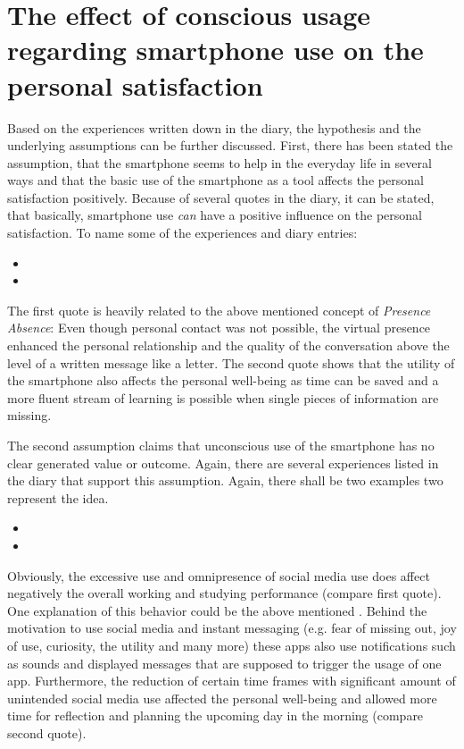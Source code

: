 \section*{The effect of conscious usage regarding smartphone use on the personal satisfaction}
Based on the experiences written down in the diary, the hypothesis and the underlying assumptions can be further discussed. First, there has been stated the assumption, that the smartphone seems to help in the everyday life in several ways and that the basic use of the smartphone as a tool affects the personal satisfaction positively. Because of several quotes in the diary, it can be stated, that basically, smartphone use \textit{can} have a positive influence on the personal satisfaction. To name some of the experiences and diary entries:
\begin{itemize}
\item {}
\item {}
\end{itemize}

The first quote is heavily related to the above mentioned concept of \textit{Presence Absence}: Even though personal contact was not possible, the virtual presence enhanced the personal relationship and the quality of the conversation above the level of a written message like a letter. The second quote shows that the utility of the smartphone also affects the personal well-being as time can be saved and a more fluent stream of learning is possible when single pieces of information are missing.

The second assumption claims that unconscious use of the smartphone has no clear generated value or outcome. Again, there are several experiences listed in the diary that support this assumption. Again, there shall be two examples two represent the idea.

\begin{itemize}
\item {}
\item {}
\end{itemize}

Obviously, the excessive use and omnipresence of social media use does affect negatively the overall working and studying performance (compare first quote). One explanation of this behavior could be the above mentioned  \citep{Fogg.2015}. Behind the motivation to use social media and instant messaging (e.g. fear of missing out, joy of use, curiosity, the utility and many more) these apps also use notifications such as sounds and displayed messages that are supposed to trigger the usage of one app. Furthermore, the reduction of certain time frames with significant amount of unintended social media use affected the personal well-being and allowed more time for reflection and planning the upcoming day in the morning (compare second quote). 

